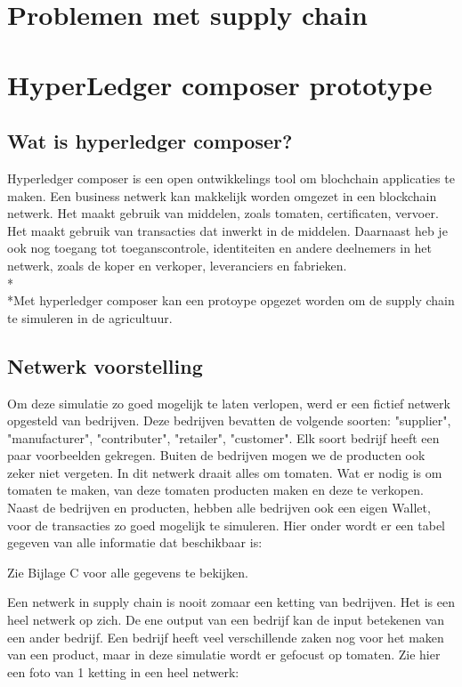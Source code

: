 \documentclass[fleqn,a4paper,12pt]{book}
\begin{document}
\chapter{Problemen met supply chain}

\chapter{HyperLedger composer prototype}
\section{Wat is hyperledger composer?}
Hyperledger composer is een open ontwikkelings tool om blochchain applicaties te maken. Een business netwerk kan makkelijk worden omgezet in een blockchain netwerk. Het maakt gebruik van middelen, zoals tomaten, certificaten, vervoer. Het maakt gebruik van transacties dat inwerkt in de middelen. Daarnaast heb je ook nog toegang tot toeganscontrole, identiteiten en andere deelnemers in het netwerk, zoals de koper en verkoper, leveranciers en fabrieken.\\*\\*Met hyperledger composer kan een protoype opgezet worden om de supply chain te simuleren in de agricultuur.
~\autocite{composer1}

\section{Netwerk voorstelling}
Om deze simulatie zo goed mogelijk te laten verlopen, werd er een fictief netwerk opgesteld van bedrijven. Deze bedrijven bevatten de volgende soorten: "supplier", "manufacturer", "contributer", "retailer", "customer". Elk soort bedrijf heeft een paar voorbeelden gekregen. Buiten de bedrijven mogen we de producten ook zeker niet vergeten. In dit netwerk draait alles om tomaten. Wat er nodig is om tomaten te maken, van deze tomaten producten maken en deze te verkopen. Naast de bedrijven en producten, hebben alle bedrijven ook een eigen Wallet, voor de transacties zo goed mogelijk te simuleren. Hier onder wordt er een tabel gegeven van alle informatie dat beschikbaar is:

Zie Bijlage C voor alle gegevens te bekijken.

Een netwerk in supply chain is nooit zomaar een ketting van bedrijven. Het is een heel netwerk op zich. De ene output van een bedrijf kan de input betekenen van een ander bedrijf. Een bedrijf heeft veel verschillende zaken nog voor het maken van een product, maar in deze simulatie wordt er gefocust op tomaten. Zie hier een foto van 1 ketting in een heel netwerk:
\end{document}
